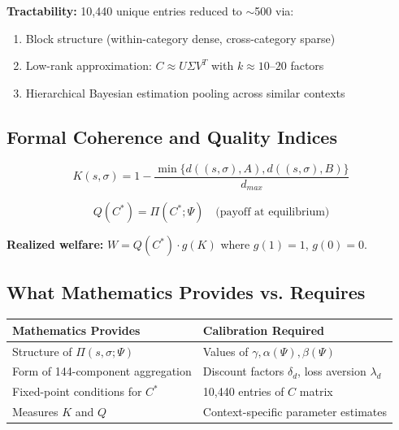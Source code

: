 \textbf{Tractability:} 10,440 unique entries reduced to $\sim$500 via:
\begin{enumerate}[nosep]
\item Block structure (within-category dense, cross-category sparse)
\item Low-rank approximation: $C \approx U\Sigma V^T$ with $k \approx 10$--$20$ factors
\item Hierarchical Bayesian estimation pooling across similar contexts
\end{enumerate}

\subsection{Formal Coherence and Quality Indices}

\begin{equation}
K(s, \sigma) = 1 - \frac{\min\{d((s,\sigma), A), d((s,\sigma), B)\}}{d_{max}}
\label{eq:mp-k-formal}
\end{equation}

\begin{equation}
Q(C^*) = \Pi(C^*; \Psi) \quad \text{(payoff at equilibrium)}
\label{eq:mp-q-formal}
\end{equation}

\textbf{Realized welfare:} $W = Q(C^*) \cdot g(K)$ where $g(1) = 1$, $g(0) = 0$.

\subsection{What Mathematics Provides vs. Requires}

\begin{center}
\renewcommand{\arraystretch}{1.2}
\begin{tabular}{@{}ll@{}}
\toprule
\textbf{Mathematics Provides} & \textbf{Calibration Required} \\
\midrule
Structure of $\Pi(s,\sigma;\Psi)$ & Values of $\gamma, \alpha(\Psi), \beta(\Psi)$ \\
Form of 144-component aggregation & Discount factors $\delta_d$, loss aversion $\lambda_d$ \\
Fixed-point conditions for $C^*$ & 10,440 entries of $C$ matrix \\
Measures $K$ and $Q$ & Context-specific parameter estimates \\
\bottomrule
\end{tabular}
\end{center}

